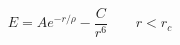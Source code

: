 \documentclass[12pt]{article}
\begin{document}
$$
   E = A e^{-r / \rho} - \frac{C}{r^6} \qquad r < r_c
$$
\end{document}
